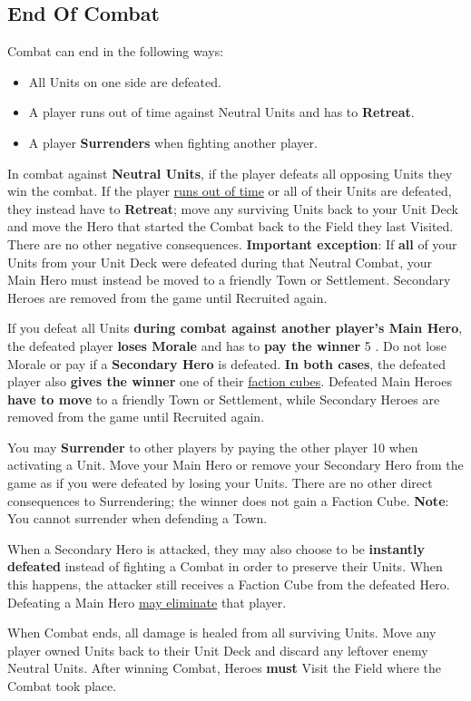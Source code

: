 \begin{multicols}{2}
\subsection*{\hypertarget{Endcombat}{End Of Combat}}
Combat can end in the following ways:
\begin{itemize}
    \item All Units on one side are defeated.
    \item A player runs out of time against Neutral Units and has to \textbf{Retreat}.
    \item A player \textbf{Surrenders} when fighting another player.
\end{itemize}
In combat against \textbf{Neutral Units}, if the player defeats all opposing Units they win the combat.
If the player \hyperlink{Timelimit}{runs out of time} or all of their Units are defeated, they instead have to \textbf{Retreat}; move any surviving Units back to your Unit Deck and move the Hero that started the Combat back to the Field they last Visited.
There are no other negative consequences.
\textbf{Important exception}: If \textbf{all} of your Units from your Unit Deck were defeated during that Neutral Combat, your Main Hero must instead be moved to a friendly Town or Settlement. Secondary Heroes are removed from the game until Recruited again.\par
If you defeat all Units \textbf{during combat against another player's Main Hero}, the defeated player \textbf{loses Morale} and has to \textbf{pay the winner} 5 .
Do not lose Morale or pay  if a \textbf{Secondary Hero} is defeated.
\textbf{In both cases}, the defeated player also \textbf{gives the winner} one of their \hyperlink{End}{faction cubes}.
Defeated Main Heroes \textbf{have to move} to a friendly Town or Settlement, while Secondary Heroes are removed from the game until Recruited again.\par
You may \textbf{Surrender} to other players by paying the other player 10  when activating a Unit.
Move your Main Hero or remove your Secondary Hero from the game as if you were defeated by losing your Units.
There are no other direct consequences to Surrendering; the winner does not gain a Faction Cube.
\textbf{Note}: You cannot surrender when defending a Town.\par
When a Secondary Hero is attacked, they may also choose to be \textbf{instantly defeated} instead of fighting a Combat in order to preserve their Units.
When this happens, the attacker still receives a Faction Cube from the defeated Hero.
Defeating a Main Hero \hyperlink{End}{may eliminate} that player.\par
When Combat ends, all damage is healed from all surviving Units.
Move any player owned Units back to their Unit Deck and discard any leftover enemy Neutral Units.
After winning Combat, Heroes \textbf{must} Visit the Field where the Combat took place.


\end{multicols}
